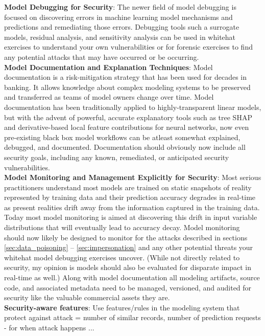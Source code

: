 \documentclass[fleqn]{article}
\begin{document}
\noindent\textbf{Model Debugging for Security}: The newer field of model debugging is focused on discovering errors in machine learning model mechanisms and predictions and remediating those errors. Debugging tools such a surrogate models, residual analysis, and sensitivity analysis can be used in whitehat exercises to understand your own vulnerabilities or for forensic exercises to find any potential attacks that may have occurred or be occurring.\\

\noindent\textbf{Model Documentation and Explanation Techniques}: Model documentation is a risk-mitigation strategy that has been used for decades in banking. It allows knowledge about complex modeling systems to be preserved and transferred as teams of model owners change over time. Model documentation has been traditionally applied to highly-transparent linear models, but with the advent of powerful, accurate explanatory tools such as tree SHAP and derivative-based local feature contributions for neural networks, now even pre-existing black box model workflows can be atleast somewhat explained, debugged, and documented. Documentation should obviously now include all security goals, including any known, remediated, or anticipated security vulnerabilities.\\

\noindent\textbf{Model Monitoring and Management Explicitly for Security}: Most serious practitioners understand most models are trained on static snapshots of reality represented by training data and their prediction accuracy degrades in real-time as present realities drift away from the information captured in the training data. Today most model monitoring is aimed at discovering this drift in input variable distributions that will eventually lead to accuracy decay. Model monitoring should now likely be designed to monitor for the attacks described in sections  \ref{sec:data_poisoning} -- \ref{sec:impersonation} and any other potential threats your whitehat model debugging exercises uncover. (While not directly related to security, my opinion is models should also be evaluated for disparate impact in real-time as well.) Along with model documentation all modeling artifacts, source code, and associated metadata need to be managed, versioned, and audited for security like the valuable commercial assets they are.\\

\noindent\textbf{Security-aware features}: Use features/rules in the modeling system that protect against attack = number of similar records, number of prediction requests - for when attack happens ...\\
\end{document}
